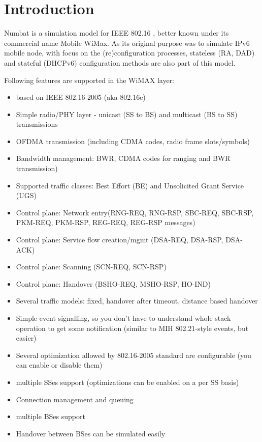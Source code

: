 \section{Introduction}

Numbat is a simulation model for IEEE 802.16 \cite{802.16e}, better
known under its commercial name Mobile WiMax. As its original purpose
was to simulate IPv6 mobile node, with focus on the (re)configuration
processes, stateless (RA, DAD) and stateful (DHCPv6) configuration
methods are also part of this model. 

Following features are supported in the WiMAX layer:
\begin{itemize}
\item based on IEEE 802.16-2005 (aka 802.16e)
\item Simple radio/PHY layer - unicast (SS to BS) and multicast (BS to SS) transmissions
\item OFDMA transmission (including CDMA codes, radio frame slots/symbols)
\item Bandwidth management: BWR, CDMA codes for ranging and BWR transmission)
\item Supported traffic classes: Best Effort (BE) and Unsolicited Grant Service (UGS)
\item Control plane: Network entry(RNG-REQ, RNG-RSP, SBC-REQ, SBC-RSP, PKM-REQ, PKM-RSP, REG-REQ, REG-RSP messages)
\item Control plane: Service flow creation/mgmt (DSA-REQ, DSA-RSP, DSA-ACK)
\item Control plane: Scanning (SCN-REQ, SCN-RSP)
\item Control plane: Handover (BSHO-REQ, MSHO-RSP, HO-IND)
\item Several traffic models: fixed, handover after timeout, distance based handover
\item Simple event signalling, so you don't have to understand whole
  stack operation to get some notification (similar to MIH
  802.21-style events, but easier)
\item Several optimization allowed by 802.16-2005 standard are
  configurable (you can enable or disable them)
\item multiple SSes support (optimizations can be enabled on a per SS basis)
\item Connection management and queuing
\item multiple BSes support
\item Handover between BSes can be simulated easily
\end{itemize}

